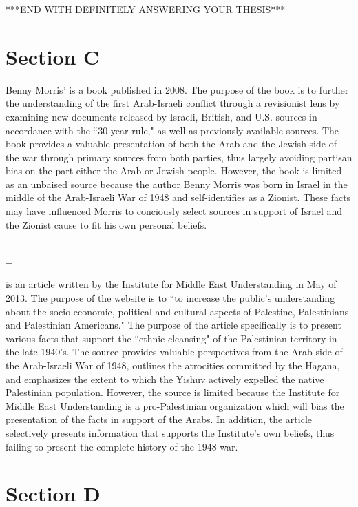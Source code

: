\documentclass{turabian-researchpaper}
\begin{document}
***END WITH DEFINITELY ANSWERING YOUR THESIS***


\section{Section C}
\noindent {}

Benny Morris'  is a book published in 2008.  The purpose of the book is to further the understanding of the first Arab-Israeli conflict through a revisionist lens by examining new documents released by Israeli, British, and U.S. sources in accordance with the ``30-year rule," as well as previously available sources.  The book provides a valuable presentation of both the Arab and the Jewish side of the war through primary sources from both parties, thus largely avoiding partisan bias on the part either the Arab or Jewish people.  However, the book is limited as an unbaised source because the author Benny Morris was born in Israel in the middle of the Arab-Israeli War of 1948 and self-identifies as a Zionist.  These facts may have influenced Morris to conciously select sources in support of Israel and the Zionist cause to fit his own personal beliefs.

~\\

\hangindent=\parindent \noindent {}

 is an article written by the Institute for Middle East Understanding in May of 2013.  The purpose of the website is to ``to increase the public's understanding about the socio-economic, political and cultural aspects of Palestine, Palestinians and Palestinian Americans."  The purpose of the article specifically is to present various facts that support the ``ethnic cleansing" of the Palestinian territory in the late 1940's.  The source provides valuable perspectives from the Arab side of the Arab-Israeli War of 1948, outlines the atrocities committed by the Hagana, and emphasizes the extent to which the Yishuv actively expelled the native Palestinian population.  However, the source is limited because the Institute for Middle East Understanding is a pro-Palestinian organization which will bias the presentation of the facts in support of the Arabs.  In addition, the article selectively presents information that supports the Institute's own beliefs, thus failing to present the complete history of the 1948 war.

\section{Section D}
\end{document}
